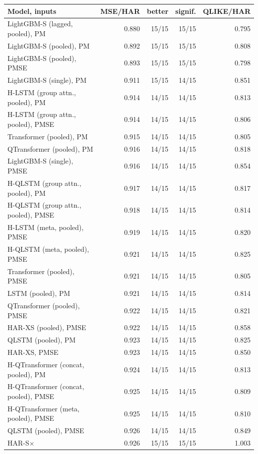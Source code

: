 \begin{tabular}{lrrrr}
\toprule
Model, inputs & MSE/HAR & better & signif. & QLIKE/HAR \\
\midrule
LightGBM-S (lagged, pooled), PM & 0.880 & 15/15 & 15/15 & 0.795 \\
LightGBM-S (pooled), PM & 0.892 & 15/15 & 15/15 & 0.808 \\
LightGBM-S (pooled), PMSE & 0.893 & 15/15 & 15/15 & 0.798 \\
LightGBM-S (single), PM & 0.911 & 15/15 & 14/15 & 0.851 \\
H-LSTM (group attn., pooled), PM & 0.914 & 14/15 & 14/15 & 0.813 \\
H-LSTM (group attn., pooled), PMSE & 0.914 & 14/15 & 14/15 & 0.806 \\
Transformer (pooled), PM & 0.915 & 14/15 & 14/15 & 0.805 \\
QTransformer (pooled), PM & 0.916 & 14/15 & 14/15 & 0.818 \\
LightGBM-S (single), PMSE & 0.916 & 14/15 & 14/15 & 0.854 \\
H-QLSTM (group attn., pooled), PM & 0.917 & 14/15 & 14/15 & 0.817 \\
H-QLSTM (group attn., pooled), PMSE & 0.918 & 14/15 & 14/15 & 0.814 \\
H-LSTM (meta, pooled), PMSE & 0.919 & 14/15 & 14/15 & 0.820 \\
H-QLSTM (meta, pooled), PMSE & 0.921 & 14/15 & 14/15 & 0.825 \\
Transformer (pooled), PMSE & 0.921 & 14/15 & 14/15 & 0.805 \\
LSTM (pooled), PM & 0.921 & 14/15 & 14/15 & 0.814 \\
QTransformer (pooled), PMSE & 0.922 & 14/15 & 14/15 & 0.821 \\
HAR-XS (pooled), PMSE & 0.922 & 14/15 & 14/15 & 0.858 \\
QLSTM (pooled), PM & 0.923 & 14/15 & 14/15 & 0.825 \\
HAR-XS, PMSE & 0.923 & 14/15 & 14/15 & 0.850 \\
H-QTransformer (concat, pooled), PM & 0.924 & 14/15 & 14/15 & 0.813 \\
H-QTransformer (concat, pooled), PMSE & 0.925 & 14/15 & 14/15 & 0.809 \\
H-QTransformer (meta, pooled), PMSE & 0.925 & 14/15 & 14/15 & 0.810 \\
QLSTM (pooled), PMSE & 0.926 & 14/15 & 14/15 & 0.849 \\
HAR-S$\times$ & 0.926 & 15/15 & 15/15 & 1.003 \\

\end{tabular}

